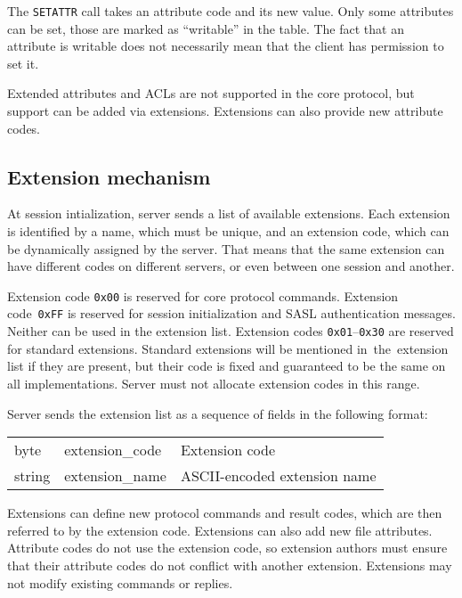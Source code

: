 The {\tt SETATTR} call takes an attribute code and its new value. Only some attributes can be set, those are
marked as ``writable'' in the table. The fact that an attribute is writable does not necessarily mean that the
client has permission to set it.

Extended attributes and ACLs are not supported in the core protocol, but support can be added via extensions.
Extensions can also provide new attribute codes.

%

\def\pkfield#1#2#3{ {\ttfamily #1} & {\ttfamily #2} & #3 \\ }
\newcommand{\beginpk}[1][p{3.2cm} p{6.8cm}] {
	\begin{center}
	\begin{tabular}{l #1}
}
\def\endpk{
	\end{tabular}
	\end{center}
}

\subsection{Extension mechanism}
\label{ssec:extensions}

At session intialization, server sends a list of available extensions. Each extension is identified by a name,
which must be unique, and an extension code, which can be dynamically assigned by the server. That means that
the same extension can have different codes on different servers, or even between one session and another.

Extension code {\tt 0x00} is reserved for core protocol commands. Extension code~{\tt 0xFF} is reserved for
session initialization and SASL authentication messages. Neither can be used in the extension list.  Extension
codes {\tt 0x01}--{\tt 0x30} are reserved for standard extensions. Standard extensions will be mentioned
in~the~extension list if they are present, but their code is fixed and guaranteed to be the same on all
implementations.  Server must not allocate extension codes in this range.

Server sends the extension list as a sequence of fields in the following format:
\beginpk
	\pkfield{byte}{extension\_code}{Extension code}
	\pkfield{string}{extension\_name}{ASCII-encoded extension name}
\endpk

Extensions can define new protocol commands and result codes, which are then referred to by the extension
code. Extensions can also add new file attributes. Attribute codes do not use the extension code, so extension
authors must ensure that their attribute codes do not conflict with another extension. Extensions may not modify
existing commands or replies.

